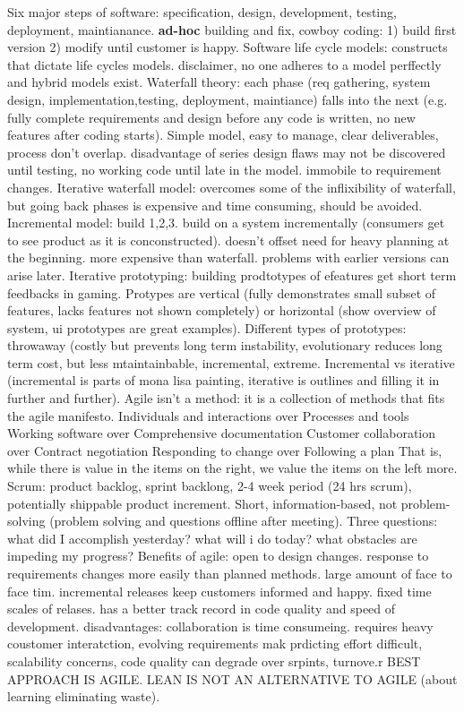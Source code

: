 \documentclass[10pt]{article}
\begin{document}
\begin{landscape}
\begin{multicols*}{6}
Six major steps of software: specification, design, development, testing, deployment, maintianance. \textbf{ad-hoc} building and fix, cowboy coding: 1) build first version 2) modify until customer is happy.
Software life cycle models: constructs that dictate life cycles models. disclaimer, no one adheres to a model perffectly and hybrid models exist.
Waterfall theory: each phase (req gathering, system design, implementation,testing, deployment, maintiance) falls into the next (e.g. fully complete requirements and design before any code is written, no new features after coding starts). Simple model, easy to manage, clear deliverables, process don't overlap. disadvantage of series design flaws may not be discovered until testing, no working code until late in the model. immobile to requirement changes. Iterative waterfall model: overcomes some of the inflixibility of waterfall, but going back phases is expensive and time consuming, should be avoided.
Incremental model: build 1,2,3. build on a system incrementally (consumers get to see product as it is conconstructed). doesn't offset need for heavy planning at the beginning. more expensive than waterfall. problems with earlier versions can arise later.
Iterative prototyping: building prodtotypes of efeatures get short term feedbacks in gaming. Protypes are vertical (fully demonstrates small subset of features, lacks features not shown completely) or horizontal (show overview of system, ui prototypes are great examples).
Different types of prototypes: throwaway (costly but prevents long term instability, evolutionary reduces long term cost, but less mtaintainbable, incremental, extreme.
Incremental vs iterative (incremental is parts of mona lisa painting, iterative is outlines and filling it in further and further).
Agile isn't a method: it is a collection of methods that fits the agile manifesto. Individuals and interactions over Processes and tools Working software over Comprehensive documentation Customer collaboration over Contract negotiation Responding to change over Following a plan
That is, while there is value in the items on the right, we value the items on the left more.
Scrum: product backlog, sprint backlong, 2-4 week period (24 hrs  scrum), potentially shippable product increment. Short, information-based, not problem-solving (problem solving and questions offline after meeting). Three questions: what did I accomplish yesterday? what will i do today? what obstacles are impeding my progress?
Benefits of agile: open to design changes. response to requirements changes more easily than planned methods. large amount of face to face tim. incremental releases keep customers informed and happy. fixed time scales of relases. has a better track record in code quality and speed of development. disadvantages: collaboration is time consumeing. requires heavy coustomer interatction, evolving requirements mak prdicting effort difficult, scalability concerns, code  quality can degrade over srpints, turnove.r BEST APPROACH IS AGILE. LEAN IS NOT AN ALTERNATIVE TO AGILE (about learning eliminating waste).

\end{multicols*}
\end{landscape}
\end{document}

